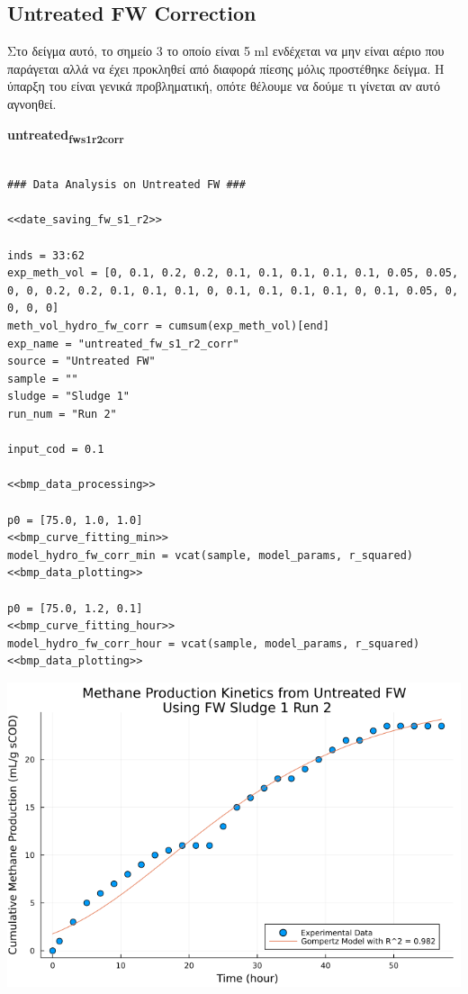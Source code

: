 \documentclass[11pt]{article}
\begin{document}
\subsection{Untreated FW Correction}
\label{sec:org0d17f56}
Στο δείγμα αυτό, το σημείο 3 το οποίο είναι 5 ml ενδέχεται να μην είναι αέριο που παράγεται αλλά να έχει προκληθεί από διαφορά πίεσης μόλις προστέθηκε δείγμα. Η ύπαρξη του είναι γενικά προβληματική, οπότε θέλουμε να δούμε τι γίνεται αν αυτό αγνοηθεί.

\textbf{untreated\textsubscript{fw}\textsubscript{s1}\textsubscript{r2}\textsubscript{corr}}
\begin{verbatim}

### Data Analysis on Untreated FW ###

<<date_saving_fw_s1_r2>>

inds = 33:62
exp_meth_vol = [0, 0.1, 0.2, 0.2, 0.1, 0.1, 0.1, 0.1, 0.1, 0.05, 0.05, 0, 0, 0.2, 0.2, 0.1, 0.1, 0.1, 0, 0.1, 0.1, 0.1, 0.1, 0, 0.1, 0.05, 0, 0, 0, 0]
meth_vol_hydro_fw_corr = cumsum(exp_meth_vol)[end]
exp_name = "untreated_fw_s1_r2_corr"
source = "Untreated FW"
sample = ""
sludge = "Sludge 1"
run_num = "Run 2"

input_cod = 0.1

<<bmp_data_processing>>

p0 = [75.0, 1.0, 1.0]
<<bmp_curve_fitting_min>>
model_hydro_fw_corr_min = vcat(sample, model_params, r_squared)
<<bmp_data_plotting>>

p0 = [75.0, 1.2, 0.1]
<<bmp_curve_fitting_hour>>
model_hydro_fw_corr_hour = vcat(sample, model_params, r_squared)
<<bmp_data_plotting>>
\end{verbatim}

\begin{center}
\includegraphics[width=.9\linewidth]{../plots/BMPs/Untreated FW/methane_kinetics_untreated_fw_s1_r2_corr_hour.png}
\end{center}
\end{document}

